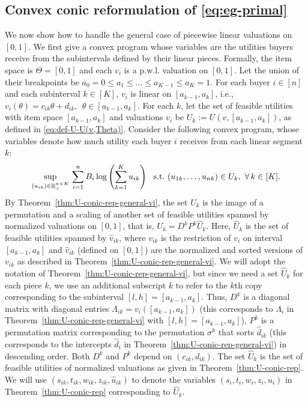 \subsection{Convex conic reformulation of \eqref{eq:eg-primal}} \label{subsec:convex-conic-reform-of-EG-pwl}
We now show how to handle the general case of piecewise linear valuations on $[0,1]$.
We first give a convex program whose variables are the utilities buyers receive from the subintervals defined by their linear pieces.
Formally, the item space is $\Theta = [0,1]$ and each $v_i$ is a p.w.l. valuation on $[0,1]$. Let the union of their breakpoints be $a_0 = 0 \leq a_1 \leq \dots \leq a_{K-1} \leq a_K = 1$. 
For each buyer $i\in [n]$ and each subinterval $k\in [K]$, $v_i$ is linear on $[a_{k-1}, a_k]$, i.e., 
$v_i(\theta) = c_{ik} \theta + d_{ik},\ \ \theta \in [a_{k-1}, a_k]$.
For each $k$, let the set of feasible utilities with item space $[a_{k-1},a_k]$ and valuations $v_i$ be $U_k := U(v, [a_{k-1}, a_k])$,
as defined in \eqref{eq:def-U-U(v,Theta)}. 
Consider the following convex program, whose variables denote how much utility each buyer $i$ receives from each linear segment $k$:
\begin{align}
	\sup_{(u_{ik}) \in \mathbb{R}_+^{n\times K} } \, \sum_{i=1}^n B_i \log \left(\sum_{k=1}^K u_{ik}\right) \ \ {\rm s.t.}\  (u_{1k}, \dots, u_{nk}) \in U_{k},\ \forall\,k \in [K].
	\label{eq:convex-prog-u(ik)}
\end{align}
By Theorem~\ref{thm:U-conic-rep-general-vi}, the set $U_k$ is the image of a permutation and a scaling of another set of feasible utilities spanned by normalized valuations on $[0,1]$, that is, 
$U_k = D^k P^k \hat{U}_k$.
Here, $\hat{U}_k$ is the set of feasible utilities spanned by $\hat{v}_{ik}$, where $v_{ik}$ is the restriction of $v_i$ on interval $[a_{k-1}, a_k]$ and $\hat{v}_{ik}$ (defined on $[0,1]$) are the normalized and sorted versions of $v_{ik}$ as described in Theorem~\ref{thm:U-conic-rep-general-vi}. 
We will adopt the notation of Theorem~\ref{thm:U-conic-rep-general-vi}, but since we need a set $\hat U_k$ for each piece $k$, we use an additional subscript $k$ to refer to the $k$th copy corresponding to the subinterval $[l,h] = [a_{k-1}, a_k]$.
Thus, $D^k$ is a diagonal matrix with diagonal entries $\Lambda_{ik} = v_i([a_{k-1}, a_k])$ (this corresponds to $\Lambda_i$ in Theorem~\ref{thm:U-conic-rep-general-vi} with $[l,h] = [a_{k-1}, a_k]$), $P^k$ is a permutation matrix corresponding to the permutation $\sigma^k$ that sorts $\hat{d}_{ik}$ (this corresponds to the intercepts $\hat{d}_i$ in Theorem~\ref{thm:U-conic-rep-general-vi}) in descending order. 
Both $D^k$ and $P^k$ depend on $(c_{ik}, d_{ik})$. 
The set $\hat{U}_k$ is the set of feasible utilities of normalized valuations as given in Theorem~\ref{thm:U-conic-rep}. 
We will use $(s_{ik}, t_{ik}, w_{ik}, z_{ik}, \hat{u}_{ik})$ to denote the  variables $(s_i, t_i, w_i, z_i, u_i)$ in Theorem~\ref{thm:U-conic-rep} corresponding to $\hat U_k$.

